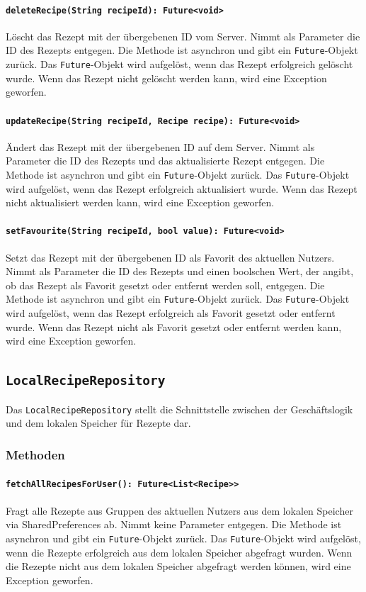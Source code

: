 \documentclass{entwurfsheft}
\begin{document}
\paragraph{\texttt{deleteRecipe(String recipeId): Future<void>}}
Löscht das Rezept mit der übergebenen ID vom Server. Nimmt als Parameter die ID des Rezepts entgegen. Die Methode ist asynchron und gibt ein \texttt{Future}-Objekt zurück. Das \texttt{Future}-Objekt wird aufgelöst, wenn das Rezept erfolgreich gelöscht wurde. Wenn das Rezept nicht gelöscht werden kann, wird eine Exception geworfen.
\paragraph{\texttt{updateRecipe(String recipeId, Recipe recipe): Future<void>}}
Ändert das Rezept mit der übergebenen ID auf dem Server. Nimmt als Parameter die ID des Rezepts und das aktualisierte Rezept entgegen. Die Methode ist asynchron und gibt ein \texttt{Future}-Objekt zurück. Das \texttt{Future}-Objekt wird aufgelöst, wenn das Rezept erfolgreich aktualisiert wurde. Wenn das Rezept nicht aktualisiert werden kann, wird eine Exception geworfen.
\paragraph{\texttt{setFavourite(String recipeId, bool value): Future<void>}}
Setzt das Rezept mit der übergebenen ID als Favorit des aktuellen Nutzers. Nimmt als Parameter die ID des Rezepts und einen boolschen Wert, der angibt, ob das Rezept als Favorit gesetzt oder entfernt werden soll, entgegen. Die Methode ist asynchron und gibt ein \texttt{Future}-Objekt zurück. Das \texttt{Future}-Objekt wird aufgelöst, wenn das Rezept erfolgreich als Favorit gesetzt oder entfernt wurde. Wenn das Rezept nicht als Favorit gesetzt oder entfernt werden kann, wird eine Exception geworfen.
\newpage
\subsection{\texttt{LocalRecipeRepository}}\label{sec:LocalRecipeRepository}
Das \texttt{LocalRecipeRepository} stellt die Schnittstelle zwischen der Geschäftslogik und dem lokalen Speicher für Rezepte dar.
\subsubsection*{Methoden}
\paragraph{\texttt{fetchAllRecipesForUser(): Future<List<Recipe>>}}
Fragt alle Rezepte aus Gruppen des aktuellen Nutzers aus dem lokalen Speicher via \Gls{SharedPreferences} ab. Nimmt keine Parameter entgegen. Die Methode ist asynchron und gibt ein \texttt{Future}-Objekt zurück. Das \texttt{Future}-Objekt wird aufgelöst, wenn die Rezepte erfolgreich aus dem lokalen Speicher abgefragt wurden. Wenn die Rezepte nicht aus dem lokalen Speicher abgefragt werden können, wird eine Exception geworfen.
\newpage
\end{document}
